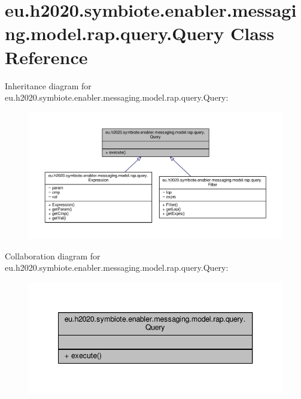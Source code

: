\hypertarget{classeu_1_1h2020_1_1symbiote_1_1enabler_1_1messaging_1_1model_1_1rap_1_1query_1_1Query}{}\section{eu.\+h2020.\+symbiote.\+enabler.\+messaging.\+model.\+rap.\+query.\+Query Class Reference}
\label{classeu_1_1h2020_1_1symbiote_1_1enabler_1_1messaging_1_1model_1_1rap_1_1query_1_1Query}


Inheritance diagram for eu.\+h2020.\+symbiote.\+enabler.\+messaging.\+model.\+rap.\+query.\+Query\+:
\nopagebreak
\begin{figure}[H]
\begin{center}
\leavevmode
\includegraphics[width=350pt]{classeu_1_1h2020_1_1symbiote_1_1enabler_1_1messaging_1_1model_1_1rap_1_1query_1_1Query__inherit__graph}
\end{center}
\end{figure}


Collaboration diagram for eu.\+h2020.\+symbiote.\+enabler.\+messaging.\+model.\+rap.\+query.\+Query\+:
\nopagebreak
\begin{figure}[H]
\begin{center}
\leavevmode
\includegraphics[width=340pt]{classeu_1_1h2020_1_1symbiote_1_1enabler_1_1messaging_1_1model_1_1rap_1_1query_1_1Query__coll__graph}
\end{center}
\end{figure}
